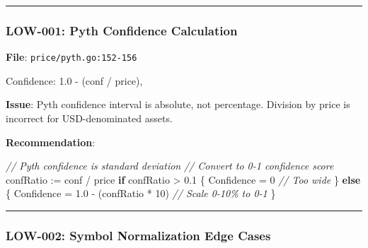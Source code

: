 \documentclass[
]{article}
\newenvironment{Shaded}{}{}
\newcommand{\CommentTok}[1]{\textcolor[rgb]{0.38,0.63,0.69}{\textit{#1}}}
\newcommand{\ControlFlowTok}[1]{\textcolor[rgb]{0.00,0.44,0.13}{\textbf{#1}}}
\newcommand{\DecValTok}[1]{\textcolor[rgb]{0.25,0.63,0.44}{#1}}
\newcommand{\FloatTok}[1]{\textcolor[rgb]{0.25,0.63,0.44}{#1}}
\newcommand{\NormalTok}[1]{#1}
\newcommand{\OperatorTok}[1]{\textcolor[rgb]{0.40,0.40,0.40}{#1}}
\begin{document}
\begin{center}\rule{0.5\linewidth}{0.5pt}\end{center}

\subsubsection{LOW-001: Pyth Confidence
Calculation}\label{low-001-pyth-confidence-calculation}

\textbf{File}: \texttt{price/pyth.go:152-156}

\begin{Shaded}
\begin{Highlighting}[]
\NormalTok{Confidence}\OperatorTok{:} \FloatTok{1.0} \OperatorTok{{-}} \OperatorTok{(}\NormalTok{conf }\OperatorTok{/}\NormalTok{ price}\OperatorTok{),}
\end{Highlighting}
\end{Shaded}

\textbf{Issue}: Pyth confidence interval is absolute, not percentage.
Division by price is incorrect for USD-denominated assets.

\textbf{Recommendation}:

\begin{Shaded}
\begin{Highlighting}[]
\CommentTok{// Pyth confidence is standard deviation}
\CommentTok{// Convert to 0{-}1 confidence score}
\NormalTok{confRatio }\OperatorTok{:=}\NormalTok{ conf }\OperatorTok{/}\NormalTok{ price}
\ControlFlowTok{if}\NormalTok{ confRatio }\OperatorTok{\textgreater{}} \FloatTok{0.1} \OperatorTok{\{}
\NormalTok{    Confidence }\OperatorTok{=} \DecValTok{0} \CommentTok{// Too wide}
\OperatorTok{\}} \ControlFlowTok{else} \OperatorTok{\{}
\NormalTok{    Confidence }\OperatorTok{=} \FloatTok{1.0} \OperatorTok{{-}} \OperatorTok{(}\NormalTok{confRatio }\OperatorTok{*} \DecValTok{10}\OperatorTok{)} \CommentTok{// Scale 0{-}10\% to 0{-}1}
\OperatorTok{\}}
\end{Highlighting}
\end{Shaded}

\begin{center}\rule{0.5\linewidth}{0.5pt}\end{center}

\subsubsection{LOW-002: Symbol Normalization Edge
Cases}\label{low-002-symbol-normalization-edge-cases}
\end{document}
